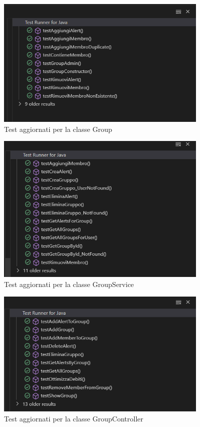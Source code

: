 \begin{figure}[H]
    \centering
    \includegraphics[width=0.9\textwidth]{images/GroupTest_iter2.png}
    \caption{Test aggiornati per la classe Group}
    \label{fig:GroupTest_iter2}
\end{figure}

\begin{figure}[H]
    \centering
    \includegraphics[width=0.9\textwidth]{images/GroupServiceTest_iter2.png}
    \caption{Test aggiornati per la classe GroupService}
    \label{fig:GroupServiceTest_iter2}
\end{figure}

\begin{figure}[H]
    \centering
    \includegraphics[width=0.9\textwidth]{images/GroupControllerTest_iter2.png}
    \caption{Test aggiornati per la classe GroupController}
    \label{fig:GroupControllerTest_iter2}
\end{figure}


